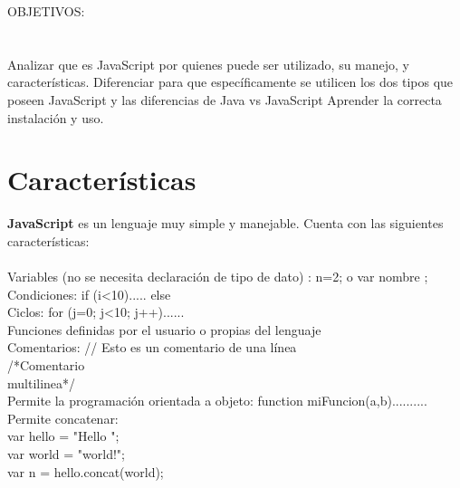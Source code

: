 \documentclass[11pt]{article} %
\begin{document}
OBJETIVOS:
\\ \\
\\Analizar que es JavaScript por quienes puede ser utilizado, su manejo, y características.
Diferenciar para que específicamente se utilicen los dos tipos que poseen JavaScript y las diferencias de Java vs JavaScript
Aprender la correcta instalación y uso.\\

\section{Características}
{\bfseries JavaScript} es un lenguaje muy simple y manejable. Cuenta con las siguientes características:\\\\
Variables (no se necesita declaración de tipo de dato) : n=2; o var nombre ;\\
Condiciones: if (i<10){.....} else{}\\
Ciclos: for (j=0; j<10; j++){......}\\
Funciones definidas por el usuario o propias del lenguaje\\
Comentarios: // Esto es un comentario de una línea\\
/*Comentario\\
multilinea*/   \\
Permite la programación orientada a objeto: function miFuncion(a,b){..........} \\
Permite concatenar:\\
var hello = "Hello "; \\
var world = "world!";\\
var n = hello.concat(world);
\end{document}

